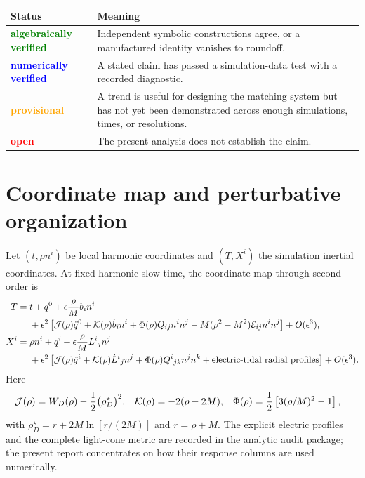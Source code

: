 \documentclass[11pt]{article}
\newcommand{\eps}{\epsilon}
\newcommand{\E}{\mathcal E}
\newcommand{\status}[2]{\textcolor{#1}{\textbf{#2}}}
\newcommand{\alg}{\status{green}{algebraically verified}}
\newcommand{\num}{\status{blue}{numerically verified}}
\newcommand{\prov}{\status{orange}{provisional}}
\newcommand{\openstatus}{\status{red}{open}}
\begin{document}
\begin{center}
\begin{tabularx}{0.92\textwidth}{>{\raggedright\arraybackslash}p{}X}
\toprule
\textbf{Status} & \textbf{Meaning}\\
\midrule
\alg & Independent symbolic constructions agree, or a manufactured identity
vanishes to roundoff.\\
\num & A stated claim has passed a simulation-data test with a recorded
diagnostic.\\
\prov & A trend is useful for designing the matching system but has not yet
been demonstrated across enough simulations, times, or resolutions.\\
\openstatus & The present analysis does not establish the claim.\\
\bottomrule
\end{tabularx}
\end{center}

\section{Coordinate map and perturbative organization}

Let \((t,\rho n^i)\) be local harmonic coordinates and \((T,X^i)\) the
simulation inertial coordinates.  At fixed harmonic slow time, the coordinate
map through second order is
\begin{align}
T={}&t+q^0
 +\eps\frac{\rho}{M}b_i n^i \notag\\
&+\eps^2\left[
  {\cal J}(\rho)\ddot q^0
 +{\cal K}(\rho)\dot b_i n^i
 +\Phi(\rho)Q_{ij}n^in^j
 -M(\rho^2-M^2)\E_{ij}n^in^j
\right]
+O(\eps^3),
\label{eq:time-map}\\
X^i={}&\rho n^i+q^i
 +\eps\frac{\rho}{M}L^i{}_j n^j \notag\\
&+\eps^2\left[
  {\cal J}(\rho)\ddot q^i
 +{\cal K}(\rho)\dot L^i{}_j n^j
 +\Phi(\rho)Q^i{}_{jk}n^jn^k
 +\text{electric-tidal radial profiles}
\right]
+O(\eps^3).
\label{eq:space-map}
\end{align}
Here
\begin{align}
{\cal J}(\rho)&=W_D(\rho)-\frac12\bigl(\rho_D^\star\bigr)^2,
&
{\cal K}(\rho)&=-2(\rho-2M),
&
\Phi(\rho)&=\frac12\left[3(\rho/M)^2-1\right],
\end{align}
with \(\rho_D^\star=r+2M\ln[r/(2M)]\) and \(r=\rho+M\).
The explicit electric profiles and the complete light-cone metric are
recorded in the analytic audit package; the present report concentrates on
how their response columns are used numerically.
\end{document}
